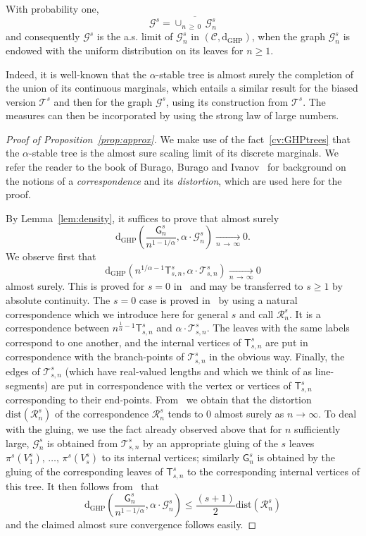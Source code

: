 \documentclass[AHL,Unicode,longabstracts,published]{cedram}
\newcommand{\GHP}{\mathrm{GHP}}
\newcommand{\rmd}{\mathrm{d}}
\newcommand{\dist}{\mathrm{dist}}
\newcommand{\cG}{\mathcal{G}}
\newcommand{\cT}{\mathcal{T}}
\newcommand{\cR}{\mathcal{R}}
\newcommand{\sG}{\mathsf{G}}
\newcommand{\sT}{\mathsf{T}}
\newcommand{\scrC}{\mathscr{C}}
\begin{document}
\begin{lemm}\label{lem:density}
With probability one,
\[
\cG^s= \overline{\cup_{n\,\geq\,0}\,\cG^s_n}
\]
and consequently $\cG^s$ is the a.s. limit of $\cG^s_n$ in $(\scrC,\rmd_{\GHP})$, when the graph $\cG_n^s$ is endowed with the uniform distribution on its leaves for $n \ge 1$.
\end{lemm}

Indeed, it is well-known that the $\alpha$-stable tree is almost surely the completion of the union of its continuous marginals, which entails a similar result for the biased version $\cT^s$ and then for the graph $\cG^s$, using its construction from $\cT^s$. The measures can then be incorporated by using the strong law of large numbers.

\begin{proof}[Proof of Proposition~\ref{prop:approx}] We make use of the fact~\eqref{cv:GHPtrees} that the $\alpha$-stable tree is the almost sure scaling limit of its discrete marginals. We refer the reader to the book of Burago, Burago and Ivanov~\cite{BBI01} for background on the notions of a \emph{correspondence} and its \emph{distortion}, which are used here for the proof.

By Lemma~\ref{lem:density}, it suffices to prove that almost surely
\[
\rmd_{\GHP}\left(\frac{\sG_n^s}{n^{1-1/\alpha}}, \alpha \cdot \cG_n^s \right) \underset{n\,\rightarrow\,\infty}\longrightarrow 0.
\]
We observe first that
\[
\rmd_{\GHP} \left(n^{1/\alpha - 1} \sT_{s,n}^{s}, \alpha \cdot \cT_{s,n}^s\right) \underset{n \,\rightarrow\,\infty}\longrightarrow 0
\]
almost surely. This is proved for $s = 0$ in~\cite[Section~2.4]{CurienHaas} and may be transferred to $s \ge 1$ by absolute continuity. The $s = 0$ case is proved in~\cite{CurienHaas} by using a natural correspondence which we introduce here for general $s$ and call $\cR_n^s$. It is a correspondence between $n^{\frac{1}{\alpha}-1} \sT^s_{s,n}$ and $\alpha \cdot \cT^s_{s,n}$. The leaves with the same labels correspond to one another, and the internal vertices of $\sT^s_{s,n}$ are put in correspondence with the branch-points of $\cT_{s,n}^s$ in the obvious way. Finally, the edges of $\cT_{s,n}^s$ (which have real-valued lengths and which we think of as line-segments) are put in correspondence with the vertex or vertices of $\sT_{s,n}^s$ corresponding to their end-points. From~\cite{CurienHaas} we obtain that the distortion $\dist(\cR_n^s)$ of the correspondence $\cR_n^s$ tends to 0 almost surely as $n \to \infty$. To deal with the gluing, we use the fact already observed above that for $n$ sufficiently large, $\cG_n^s$ is obtained from $\cT^s_{s,n}$ by an appropriate gluing of the $s$ leaves $\pi^s(V_1^s),\,\ldots,\, \pi^s(V_s^s)$ to its internal vertices; similarly $\sG_n^s$ is obtained by the gluing of the corresponding leaves of $\sT^s_{s,n}$ to the corresponding internal vertices of this tree. It then follows from~\cite[Lemma~4.2]{ABBrGoMi} that
\[
\rmd_{\GHP}\left(\frac{\sG_n^s}{n^{1-1/\alpha}}, \alpha \cdot \cG_n^s \right) \le \frac{(s+1)}{2} \dist\left(\cR_n^s\right)
\]
and the claimed almost sure convergence follows easily.
\end{proof}
\end{document}
